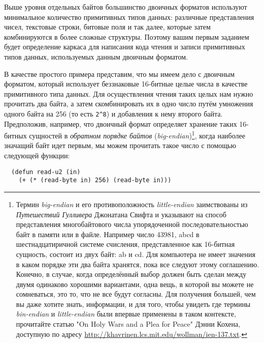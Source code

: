 Выше уровня отдельных байтов большинство двоичных форматов используют минимальное
количество примитивных типов данных: различные представления чисел, текстовые строки,
битовые поля и так далее, которые затем комбинируются в более сложные структуры. Поэтому
вашим первым заданием будет определение каркаса для написания кода чтения и записи
примитивных типов данных, используемых данным двоичным форматом.

В качестве простого примера представим, что мы имеем дело с двоичным форматом, который
использует беззнаковые 16-битные целые числа в качестве примитивного типа данных. Для
осуществления чтения таких целых нам нужно прочитать два байта, а затем скомбинировать их
в одно число путём умножения одного байта на 256 (то есть \lstinline!2^8!) и добавления к
нему второго байта. Предположив, например, что двоичный формат определяет хранение таких
16-битных сущностей в \textit{обратном порядке байтов}
(\textit{big-endian})\footnote{Термин \textit{big-endian} и его противоположность
  \textit{little-endian} заимствованы из \textit{Путешествий Гулливера} Джонатана Свифта и
  указывают на способ представления многобайтового числа упорядоченной последовательностью
  байт в памяти или в файле. Например число 43981, abcd в шестнадцатиричной системе
  счисления, представленное как 16-битная сущность, состоит из двух байт: ab и cd. Для
  компьютера не имеет значения в каком порядке эти два байта хранятся, пока все следуют
  этому соглашению. Конечно, в случае, когда определённый выбор должен быть сделан между
  двумя одинаково хорошими вариантами, одна вещь, в которой вы можете не сомневаться, это
  то, что не все будут согласны. Для получения большей, чем вы даже хотите знать,
  информации, и для того, чтобы увидеть где термины \textit{bin-endian} и
  \textit{little-endian} были впервые применены в таком контексте, прочитайте статью "On
  Holy Wars and a Plea for Peace" Дэнни Кохена, доступную по адресу
  \url{http://khavrinen.lcs.mit.edu/wollman/ien-137.txt}.}, когда наиболее значащий байт идет
первым, мы можем прочитать такое число с помощью следующей функции:

\begin{lstlisting}
  (defun read-u2 (in)
    (+ (* (read-byte in) 256) (read-byte in)))
\end{lstlisting}


